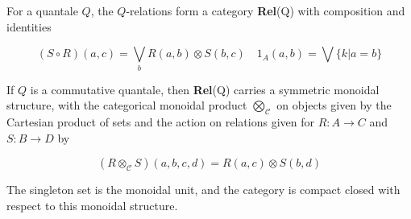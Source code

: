 \begin{proposition}
	For a quantale $Q$, the $Q$-relations form a category \textbf{Rel}(Q) with composition and identities

	\[
		(S\circ R) (a,c) = \bigvee_b R(a,b) \otimes S(b,c) \quad 1_A(a,b) = \bigvee \{k | a=b\}
	\]

	If $Q$ is a commutative quantale, then \textbf{Rel}(Q) carries a symmetric monoidal structure, with the categorical monoidal product $\bigotimes_{\mathcal{C}}$ on objects given by the Cartesian product of sets and the action on relations given for $R:A \to C$ and $S:B\to D$ by

	\[
		(R\otimes_{\mathcal{C}} S)(a,b,c,d) = R(a,c) \otimes S(b,d)
	\]

	The singleton set is the monoidal unit, and the category is compact closed with respect to this monoidal structure.
\end{proposition}

